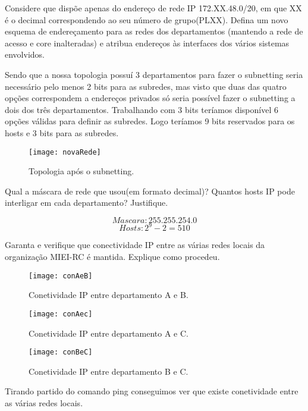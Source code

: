 \documentclass{exam}
\begin{document}
\begin{questions}

\question Considere que	dispõe apenas do endereço de rede IP 172.XX.48.0/20, em que	XX	
é o	decimal	correspondendo ao seu número de	grupo(PLXX). Defina	um novo	
esquema	de endereçamento para as redes dos departamentos (mantendo a rede	
de acesso e core inalteradas) e	atribua endereços às interfaces dos vários	
sistemas envolvidos.	
\begin{solution}
Sendo que a nossa topologia possuí 3 departamentos para fazer o subnetting seria 
necessário pelo menos 2 bits para as subredes, mas visto que duas 
das quatro opções correspondem a endereços privados só 
seria possível fazer o subnetting a dois dos três 
departamentos. Trabalhando com 3 bits teríamos 
disponível 6 opções válidas para definir as subredes.
Logo teríamos 9 bits reservados para os hosts e 3 bits 
para as subredes.
\end{solution}
\begin{figure}[H]
\centering\texttt{[image: novaRede]} 
\caption{\label{fig:controller}Topologia após o subnetting.}
\end{figure} 

\question Qual a máscara de rede que usou(em formato decimal)? Quantos hosts IP pode	
interligar em cada departamento? Justifique.
\begin{solution}
\begin{equation}
Mascara:255.255.254.0
\end{equation}
\begin{equation}
Hosts: 2^9 - 2=510
\end{equation}
\end{solution}

\question Garanta e verifique que conectividade IP entre as várias redes locais da organização
MIEI-RC é mantida. Explique como procedeu.
\begin{solution}
\begin{figure}[H]
\centering\texttt{[image: conAeB]} 
\caption{\label{fig:controller}Conetividade IP entre departamento A e B.}
\end{figure} 
\begin{figure}[H]
\centering\texttt{[image: conAec]}
\caption{\label{fig:controller}Conetividade IP entre departamento A e C.}
\end{figure} 
\begin{figure}[H]
\centering\texttt{[image: conBeC]}
\caption{\label{fig:controller}Conetividade IP entre departamento B e C.}
\end{figure} 
Tirando partido do comando ping conseguimos ver que existe conetividade entre as várias redes locais.
\end{solution}

\end{questions}
\end{document}
